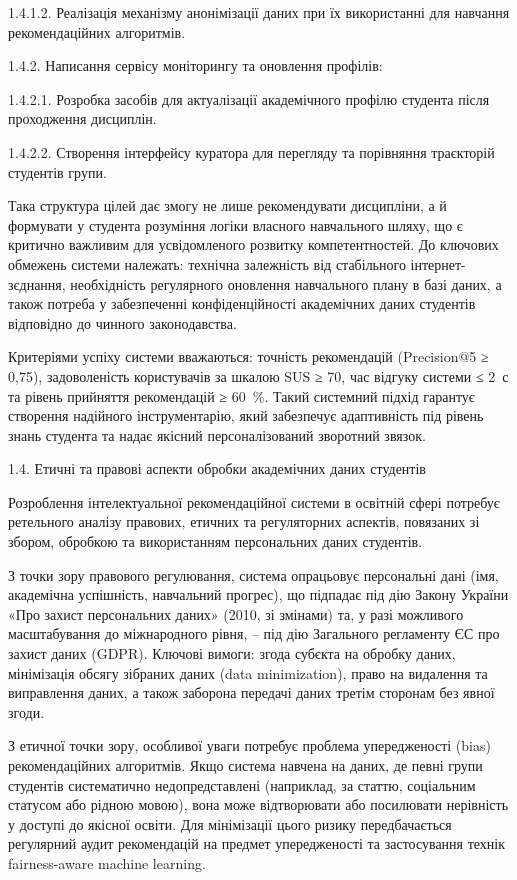 \documentclass[
]{article}
\begin{document}
1.4.1.2. Реалізація механізму анонімізації даних при їх використанні для
навчання рекомендаційних алгоритмів.

1.4.2. Написання сервісу моніторингу та оновлення профілів:

1.4.2.1. Розробка засобів для актуалізації академічного профілю студента
після проходження дисциплін.

1.4.2.2. Створення інтерфейсу куратора для перегляду та порівняння
траєкторій студентів групи.

Така структура цілей дає змогу не лише рекомендувати дисципліни, а й
формувати у студента розуміння логіки власного навчального шляху, що є
критично важливим для усвідомленого розвитку компетентностей. До
ключових обмежень системи належать: технічна залежність від стабільного
інтернет-з\textquotesingle єднання, необхідність регулярного оновлення
навчального плану в базі даних, а також потреба у забезпеченні
конфіденційності академічних даних студентів відповідно до чинного
законодавства.

Критеріями успіху системи вважаються: точність рекомендацій (Precision@5
≥ 0,75), задоволеність користувачів за шкалою SUS ≥ 70, час відгуку
системи ≤ 2~с та рівень прийняття рекомендацій ≥ 60~\%. Такий системний
підхід гарантує створення надійного інструментарію, який забезпечує
адаптивність під рівень знань студента та надає якісний персоналізований
зворотний зв\textquotesingle язок.

\protect{}\label{_Toc230434082}{}1.4. Етичні та правові
аспекти обробки академічних даних студентів

Розроблення інтелектуальної рекомендаційної системи в освітній сфері
потребує ретельного аналізу правових, етичних та регуляторних аспектів,
пов\textquotesingle язаних зі збором, обробкою та використанням
персональних даних студентів.

З точки зору правового регулювання, система опрацьовує персональні дані
(ім\textquotesingle я, академічна успішність, навчальний прогрес), що
підпадає під дію Закону України «Про захист персональних даних» (2010,
зі змінами) та, у разі можливого масштабування до міжнародного рівня, --
під дію Загального регламенту ЄС про захист даних (GDPR). Ключові
вимоги: згода суб\textquotesingle єкта на обробку даних, мінімізація
обсягу зібраних даних (data minimization), право на видалення та
виправлення даних, а також заборона передачі даних третім сторонам без
явної згоди.

З етичної точки зору, особливої уваги потребує проблема упередженості
(bias) рекомендаційних алгоритмів. Якщо система навчена на даних, де
певні групи студентів систематично недопредставлені (наприклад, за
статтю, соціальним статусом або рідною мовою), вона може відтворювати
або посилювати нерівність у доступі до якісної освіти. Для мінімізації
цього ризику передбачається регулярний аудит рекомендацій на предмет
упередженості та застосування технік fairness-aware machine learning.
\end{document}
